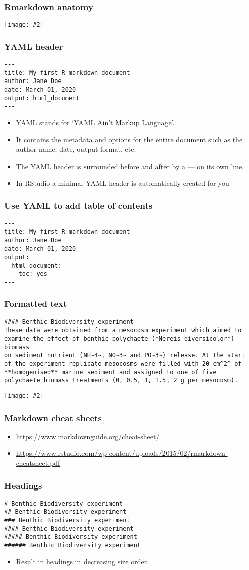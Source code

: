 \documentclass{beamer}
\newcommand{\bi}{\begin{itemize}}
\newcommand{\li}{\item}
\newcommand{\ei}{\end{itemize}}
\newcommand{\fig}[2]{\centerline{\texttt{[image: \#2]}}}
\newcommand{\bfr}[1]{\begin{frame}[fragile]\frametitle{{ #1 }}}
\begin{document}
\bfr{Rmarkdown anatomy}
\hspace{-0.25in}
\fig{1.2}{rm_components}
\end{frame}

\bfr{YAML header}
\begin{verbatim}
---
title: My first R markdown document
author: Jane Doe
date: March 01, 2020
output: html_document
---
\end{verbatim}
\bi
\li YAML stands for ‘YAML Ain’t Markup Language’.
\li It contains the metadata and options for the entire document such as the author name, date, output format, etc.
\li The YAML header is surrounded before and after by a --- on its own line.
\li In RStudio a minimal YAML header is automatically created for you 
\ei
\end{frame}

\bfr{Use YAML to add table of contents}
\begin{verbatim}
---
title: My first R markdown document
author: Jane Doe
date: March 01, 2020
output:
  html_document:
    toc: yes
---
\end{verbatim}
\end{frame}

\bfr{Formatted text}\scriptsize
\begin{verbatim}
#### Benthic Biodiversity experiment
These data were obtained from a mesocosm experiment which aimed to 
examine the effect of benthic polychaete (*Nereis diversicolor*) biomass 
on sediment nutrient (NH~4~, NO~3~ and PO~3~) release. At the start 
of the experiment replicate mesocosms were filled with 20 cm^2^ of 
**homogenised** marine sediment and assigned to one of five 
polychaete biomass treatments (0, 0.5, 1, 1.5, 2 g per mesocosm).
\end{verbatim}

\fig{1}{rmdknitted}
\end{frame}

\bfr{Markdown cheat sheets}

\bi
\li
\url{https://www.markdownguide.org/cheat-sheet/}
\li
\url{https://www.rstudio.com/wp-content/uploads/2015/02/rmarkdown-cheatsheet.pdf}
\ei
\end{frame}

\bfr{Headings}
\begin{verbatim}
# Benthic Biodiversity experiment
## Benthic Biodiversity experiment
### Benthic Biodiversity experiment
#### Benthic Biodiversity experiment
##### Benthic Biodiversity experiment
###### Benthic Biodiversity experiment
\end{verbatim}
\bi\li
Result in headings in decreasing size order.
\ei
\end{frame}
\end{document}
